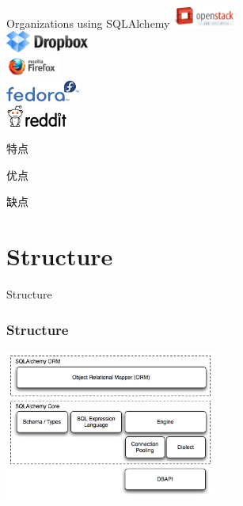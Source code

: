 \documentclass{beamer}
\begin{document}
\begin{frame}{Organizations using SQLAlchemy}
    \includegraphics[height=20pt]{oop_image/openstack.png}\\
    \includegraphics[height=20pt]{oop_image/dropbox.png}\\
    \includegraphics[height=20pt]{oop_image/firefox.png}\\
    \includegraphics[height=20pt]{oop_image/fedora-logo.png}\\
    \includegraphics[height=20pt]{oop_image/reddit.png}\\
\end{frame}

\begin{frame}{特点}
\begin{block}{优点}

\end{block}

\begin{block}{缺点}
\end{block}

\end{frame}

\section{Structure}

\begin{frame}{Structure}
    \begin{center}
    \frametitle{Structure}
    \includegraphics[height=140pt]{oop_image/structure.png}
    \end{center}
\end{frame}
\end{document}
